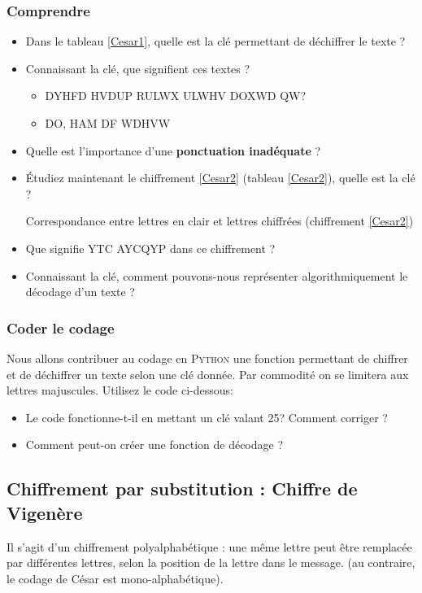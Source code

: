 \subsubsection{Comprendre}
\begin{itemize}
  \item Dans le tableau \ref{Cesar1}, quelle est la clé permettant de déchiffrer le texte ?
  \item Connaissant la clé, que signifient ces textes ?
\begin{itemize}
  \item DYHFD HVDUP RULWX ULWHV DOXWD QW?
  \item DO, HAM DF WDHVW
\end{itemize}
  \item Quelle est l'importance d'une \textbf{ponctuation inadéquate} ?
  \item Étudiez maintenant le chiffrement \ref{Cesar2} (tableau \ref{Cesar2}), quelle est la clé ?
\begin{table}[h]
\begin{tiny}

\end{tiny}
\caption{\label{Cesar2}Correspondance entre lettres en clair et lettres chiffrées (chiffrement \ref{Cesar2})}
\end{table}
  \item Que signifie YTC AYCQYP dans ce chiffrement ?
  \item Connaissant la clé, comment pouvons-nous représenter algorithmiquement le décodage d'un texte ?
\end{itemize}

\subsubsection{Coder le codage}
 Nous allons contribuer au codage en \textsc{Python} une fonction permettant de chiffrer et de déchiffrer un texte selon une clé donnée.
Par commodité on se limitera aux lettres majuscules.
Utilisez le code ci-dessous:


\begin{itemize}
  \item Le code fonctionne-t-il en mettant un clé valant 25? Comment corriger ?
  \item Comment peut-on créer une fonction de décodage ?
\end{itemize}

\subsection{Chiffrement par substitution : Chiffre de Vigenère}
 Il s'agit d'un chiffrement polyalphabétique : une même lettre peut être remplacée par différentes lettres, selon la position de la lettre dans le message. (au contraire, le codage de César est mono-alphabétique).%

